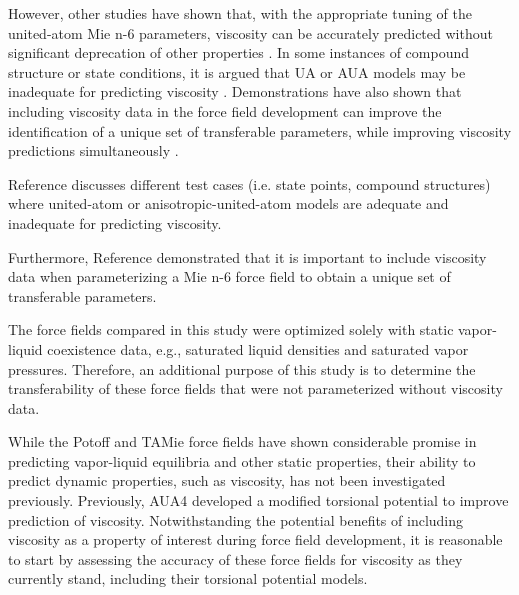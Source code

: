 \documentclass[preprint,review,12pt]{elsarticle}
\begin{document}
	
	
	However, other studies have shown that, with the appropriate tuning of the united-atom Mie n-6 parameters, viscosity can be accurately predicted without significant deprecation of other properties \cite{Gordon2006}. In some instances of compound structure or state conditions, it is argued that UA or AUA models may be inadequate for predicting viscosity \cite{Ungerer2007}. Demonstrations have also shown that including viscosity data in the force field development can improve the identification of a unique set of transferable parameters, while improving viscosity predictions simultaneously \cite{Hoang2017}.
	
	Reference  discusses different test cases (i.e. state points, compound structures) where united-atom or anisotropic-united-atom models are adequate and inadequate for predicting viscosity.
	
    Furthermore, Reference  demonstrated that it is important to include viscosity data when parameterizing a Mie n-6 force field to obtain a unique set of transferable parameters.
    
    The force fields compared in this study were optimized solely with static vapor-liquid coexistence data, e.g., saturated liquid densities and saturated vapor pressures. Therefore, an additional purpose of this study is to determine the transferability of these force fields that were not parameterized without viscosity data.
    
    While the Potoff and TAMie force fields have shown considerable promise in predicting vapor-liquid equilibria and other static properties, their ability to predict dynamic properties, such as viscosity, has not been investigated previously. Previously, AUA4 developed a modified torsional potential to improve prediction of viscosity. Notwithstanding the potential benefits of including viscosity as a property of interest during force field development, it is reasonable to start by assessing the accuracy of these force fields for viscosity as they currently stand, including their torsional potential models. 
    
    
\end{document}

